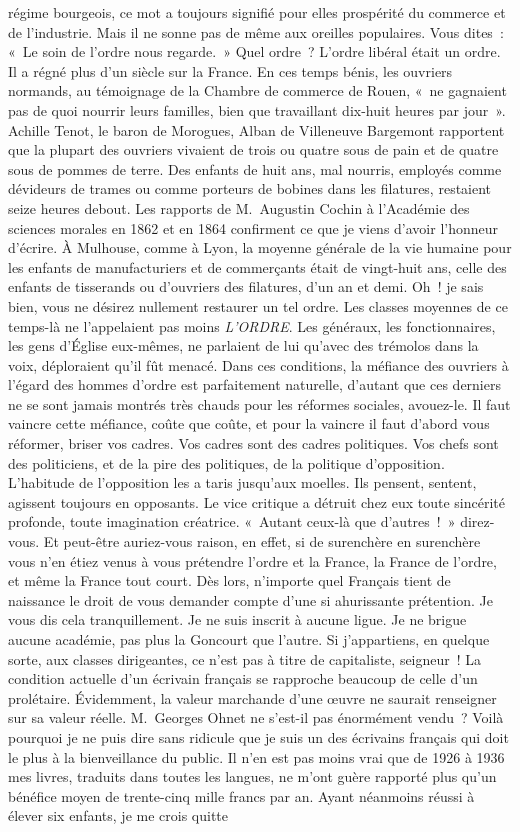 \documentclass[french,twoside]{book} %
\begin{document}
régime bourgeois, ce mot a toujours signifié pour elles prospérité du commerce et de l’industrie. Mais il ne sonne pas de même aux oreilles populaires. Vous dites : « Le soin de l’ordre nous regarde. » Quel ordre ? L’ordre libéral était un ordre. Il a régné plus d’un siècle sur la France. En ces temps bénis, les ouvriers normands, au témoignage de la Chambre de commerce de Rouen, « ne gagnaient pas de quoi nourrir leurs familles, bien que travaillant dix-huit heures par jour ». Achille Tenot, le baron de Morogues, Alban de Villeneuve Bargemont rapportent que la plupart des ouvriers vivaient de trois ou quatre sous de pain et de quatre sous de pommes de terre. Des enfants de huit ans, mal nourris, employés comme dévideurs de trames ou comme porteurs de bobines dans les filatures, restaient seize heures debout. Les rapports de M. Augustin Cochin à l’Académie des sciences morales en 1862 et en 1864 confirment ce que je viens d’avoir l’honneur d’écrire. À Mulhouse, comme à Lyon, la moyenne générale de la vie humaine pour les enfants de manufacturiers et de commerçants était de vingt-huit ans, celle des enfants de tisserands ou d’ouvriers des filatures, d’un an et demi. Oh ! je sais bien, vous ne désirez nullement restaurer un tel ordre. Les classes moyennes de ce temps-là ne l’appelaient pas moins \emph{L’ORDRE}. Les généraux, les fonctionnaires, les gens d’Église eux-mêmes, ne parlaient de lui qu’avec des trémolos dans la voix, déploraient qu’il fût menacé. Dans ces conditions, la méfiance des ouvriers à l’égard des hommes d’ordre est parfaitement naturelle, d’autant que ces derniers ne se sont jamais montrés très chauds pour les réformes sociales, avouez-le. Il faut vaincre cette méfiance, coûte que coûte, et pour la vaincre il faut d’abord vous réformer, briser vos cadres. Vos cadres sont des cadres politiques. Vos chefs sont des politiciens, et de la pire des politiques, de la politique d’opposition. L’habitude de l’opposition les a taris jusqu’aux moelles. Ils pensent, sentent, agissent toujours en opposants. Le vice critique a détruit chez eux toute sincérité profonde, toute imagination créatrice. « Autant ceux-là que d’autres ! » direz-vous. Et peut-être auriez-vous raison, en effet, si de surenchère en surenchère vous n’en étiez venus à vous prétendre l’ordre et la France, la France de l’ordre, et même la France tout court. Dès lors, n’importe quel Français tient de naissance le droit de vous demander compte d’une si ahurissante prétention. Je vous dis cela tranquillement. Je ne suis inscrit à aucune ligue. Je ne brigue aucune académie, pas plus la Goncourt que l’autre. Si j’appartiens, en quelque sorte, aux classes dirigeantes, ce n’est pas à titre de capitaliste, seigneur ! La condition actuelle d’un écrivain français se rapproche beaucoup de celle d’un prolétaire. Évidemment, la valeur marchande d’une œuvre ne saurait renseigner sur sa valeur réelle. M. Georges Ohnet ne s’est-il pas énormément vendu ? Voilà pourquoi je ne puis dire sans ridicule que je suis un des écrivains français qui doit le plus à la bienveillance du public. Il n’en est pas moins vrai que de 1926 à 1936 mes livres, traduits dans toutes les langues, ne m’ont guère rapporté plus qu’un bénéfice moyen de trente-cinq mille francs par an. Ayant néanmoins réussi à élever six enfants, je me crois quitte 
\end{document}
